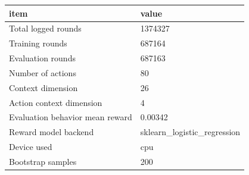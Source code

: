 \begin{tabular}{ll}
\toprule
                           item &                       value \\
\midrule
            Total logged rounds &                     1374327 \\
                Training rounds &                      687164 \\
              Evaluation rounds &                      687163 \\
              Number of actions &                          80 \\
              Context dimension &                          26 \\
       Action context dimension &                           4 \\
Evaluation behavior mean reward &                     0.00342 \\
           Reward model backend & sklearn\_logistic\_regression \\
                    Device used &                         cpu \\
              Bootstrap samples &                         200 \\
\bottomrule
\end{tabular}
